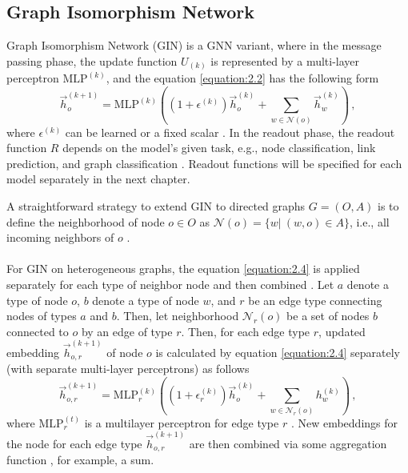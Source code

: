 \subsection{Graph Isomorphism Network} \label{graph Isomorphism network}
Graph Isomorphism Network (GIN) is a GNN variant, where in the message passing phase, the update function $U_{(k)}$ is represented by a multi-layer perceptron $\text{MLP}^{(k)}$, and the equation \ref{equation:2.2} has the following form \cite{DBLP:journals/corr/abs-1810-00826}
\begin{equation} \label{equation:2.4}
	\vec{h}_o^{(k+1)} = \text{MLP}^{(k)} \left ( \left ( 1 + \epsilon^{(k)} \right ) \vec{h}_o^{(k)} + \sum_{w\in \mathcal{N}(o)} \vec{h}_w^{(k)} \right ) \, ,
\end{equation}
where $\epsilon^{(k)}$ can be learned or a fixed scalar \cite{DBLP:journals/corr/abs-1810-00826}. In the readout phase, the readout function $R$ depends on the model's given task, e.g., node classification, link prediction, and graph classification \cite{DBLP:journals/corr/abs-1810-00826}. Readout functions will be specified for each model separately in the next chapter.
\par
A straightforward strategy to extend GIN to directed graphs $G = (O, A)$ is to define the neighborhood of node $o \in O$ as $\mathcal{N}(o) = \{ w | \ (w, o) \in A\}$, i.e., all incoming neighbors of $o$ \cite{zhang2020learning}.\\
\\
For GIN on heterogeneous graphs, the equation \ref{equation:2.4} is applied separately for each type of neighbor node and then combined \cite{10226873, pytorch_hetero_conv}. Let $a$ denote a type of node $o$, $b$ denote a type of node $w$, and $r$ be an edge type connecting nodes of types $a$ and $b$. Then, let neighborhood $\mathcal{N}_{r}(o)$ be a set of nodes $b$ connected to $o$ by an edge of type $r$. Then, for each edge type $r$, updated embedding $\vec{h}_{o, r}^{(k+1)}$ of node $o$ is calculated by equation \ref{equation:2.4} separately (with separate multi-layer perceptrons) as follows \cite{pytorch_hetero_conv}
\begin{equation} \label{equation:2.5}
	\vec{h}_{o, r}^{(k+1)} = \text{MLP}^{(k)}_{r} \left ( \left ( 1 + \epsilon_{r}^{(k)} \right ) \vec{h}_{o}^{(k)} + \sum_{w\in \mathcal{N}_{r}(o)} h_{w}^{(k)} \right ) \, ,
\end{equation}
where $\text{MLP}^{(t)}_{r}$ is a multilayer perceptron for edge type $r$ \cite{pytorch_hetero_conv}. New embeddings for the node for each edge type $\vec{h}_{o, r}^{(k+1)}$ are then combined via some aggregation function \cite{pytorch_hetero_conv}, for example, a sum.

